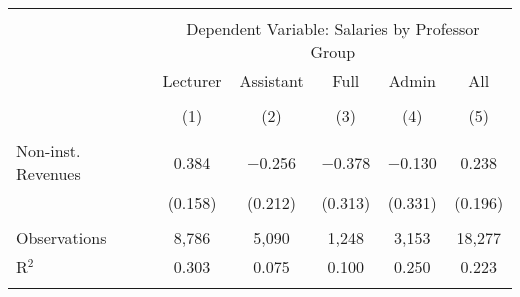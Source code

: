
\begin{tabular}{@{\extracolsep{5pt}}lccccc} 
\\[-1.8ex]\hline 
\hline \\[-1.8ex] 
 & \multicolumn{5}{c}{Dependent Variable: Salaries by Professor Group} \\ 
\cline{2-6} 
 & Lecturer & Assistant & Full & Admin & All \\ 
\\[-1.8ex] & (1) & (2) & (3) & (4) & (5)\\ 
\hline \\[-1.8ex] 
 Non-inst. Revenues & 0.384 & $-$0.256 & $-$0.378 & $-$0.130 & 0.238 \\ 
  & (0.158) & (0.212) & (0.313) & (0.331) & (0.196) \\ 
 \hline \\[-1.8ex] 
Observations & 8,786 & 5,090 & 1,248 & 3,153 & 18,277 \\ 
R$^{2}$ & 0.303 & 0.075 & 0.100 & 0.250 & 0.223 \\ 
\hline 
\hline \\[-1.8ex] 
\end{tabular} 
